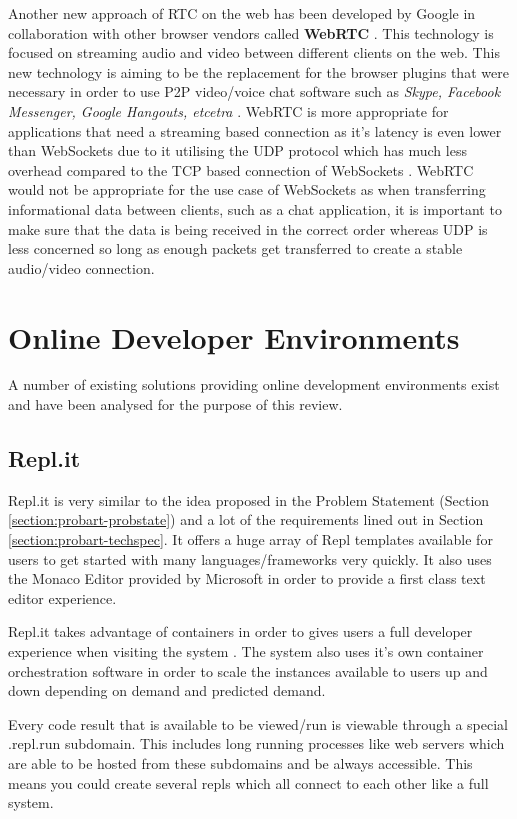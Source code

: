 Another new approach of RTC on the web has been developed by Google in collaboration with other browser vendors called \textbf{WebRTC} \cite{webrtc}. This technology is focused on streaming audio and video between different clients on the web. This new technology is aiming to be the replacement for the browser plugins that were necessary in order to use P2P video/voice chat software such as \textit{Skype, Facebook Messenger, Google Hangouts, etcetra} \cite{webrtc}. WebRTC is more appropriate for applications that need a streaming based connection as it's latency is even lower than WebSockets due to it utilising the UDP protocol which has much less overhead compared to the TCP based connection of WebSockets \cite{udpvstcp}. WebRTC would not be appropriate for the use case of WebSockets as when transferring informational data between clients, such as a chat application, it is important to make sure that the data is being received in the correct order whereas UDP is less concerned so long as enough packets get transferred to create a stable audio/video connection.


\section{Online Developer Environments} \label{lit-ode}

A number of existing solutions providing online development environments exist and have been analysed for the purpose of this review.

\subsection{Repl.it}

Repl.it is very similar to the idea proposed in the Problem Statement (Section \ref{section:probart-probstate}) and a lot of the requirements lined out in Section \ref{section:probart-techspec}. It offers a huge array of Repl templates available for users to get started with many languages/frameworks very quickly. It also uses the Monaco Editor provided by Microsoft in order to provide a first class text editor experience.

Repl.it takes advantage of containers in order to gives users a full developer experience when visiting the system \cite{replit-containers}. The system also uses it's own container orchestration software in order to scale the instances available to users up and down depending on demand and predicted demand.

Every code result that is available to be viewed/run is viewable through a special .repl.run subdomain. This includes long running processes like web servers which are able to be hosted from these subdomains and be always accessible. This means you could create several repls which all connect to each other like a full system.

